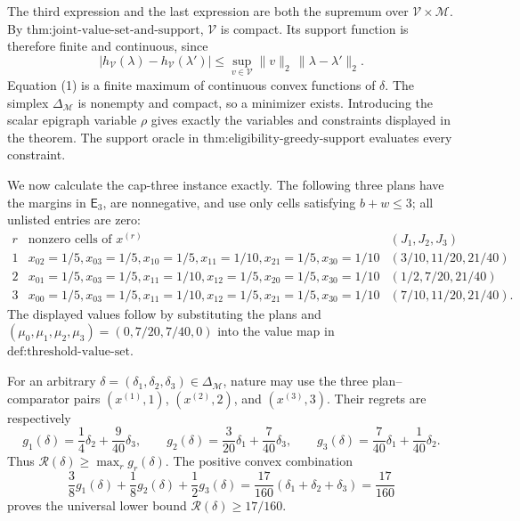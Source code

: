 The third expression and the last expression are both the supremum over \(\mathcal V\times\mathcal M\). By \(\text{thm:joint-value-set-and-support}\), \(\mathcal V\) is compact. Its support function is therefore finite and continuous, since
\[
 |h_{\mathcal V}(\lambda)-h_{\mathcal V}(\lambda')|
 \le \sup_{v\in\mathcal V}\|v\|_2\,\|\lambda-\lambda'\|_2. \tag{2}
\]
Equation (1) is a finite maximum of continuous convex functions of \(\delta\). The simplex \(\Delta_{\mathcal M}\) is nonempty and compact, so a minimizer exists. Introducing the scalar epigraph variable \(\rho\) gives exactly the variables and constraints displayed in the theorem. The support oracle in \(\text{thm:eligibility-greedy-support}\) evaluates every constraint.

We now calculate the cap-three instance exactly. The following three plans have the margins in \(\mathsf E_3\), are nonnegative, and use only cells satisfying \(b+w\le3\); all unlisted entries are zero:
\[
 \begin{array}{c|l|c}
 r&\text{nonzero cells of }x^{(r)}&(J_1,J_2,J_3)\\ \hline
 1&x_{02}=1/5, x_{03}=1/5, x_{10}=1/5, x_{11}=1/10,
      x_{21}=1/5, x_{30}=1/10&(3/10,11/20,21/40)\\
 2&x_{01}=1/5, x_{03}=1/5, x_{11}=1/10, x_{12}=1/5,
      x_{20}=1/5, x_{30}=1/10&(1/2,7/20,21/40)\\
 3&x_{00}=1/5, x_{03}=1/5, x_{11}=1/10, x_{12}=1/5,
      x_{21}=1/5, x_{30}=1/10&(7/10,11/20,21/40).
 \end{array}                                               \tag{3}
\]
The displayed values follow by substituting the plans and \((\mu_0,\mu_1,\mu_2,\mu_3)=(0,7/20,7/40,0)\) into the value map in \(\text{def:threshold-value-set}\).

For an arbitrary \(\delta=(\delta_1,\delta_2,\delta_3)\in\Delta_{\mathcal M}\), nature may use the three plan--comparator pairs \((x^{(1)},1)\), \((x^{(2)},2)\), and \((x^{(3)},3)\). Their regrets are respectively
\[
 g_1(\delta)=\frac14\delta_2+\frac9{40}\delta_3,\qquad
 g_2(\delta)=\frac3{20}\delta_1+\frac7{40}\delta_3,\qquad
 g_3(\delta)=\frac7{40}\delta_1+\frac1{40}\delta_2.     \tag{4}
\]
Thus \(\mathcal R(\delta)\ge\max_r g_r(\delta)\). The positive convex combination
\[
 \frac38g_1(\delta)+\frac18g_2(\delta)+\frac12g_3(\delta)
 =\frac{17}{160}(\delta_1+\delta_2+\delta_3)
 =\frac{17}{160}                                         \tag{5}
\]
proves the universal lower bound \(\mathcal R(\delta)\ge17/160\).

